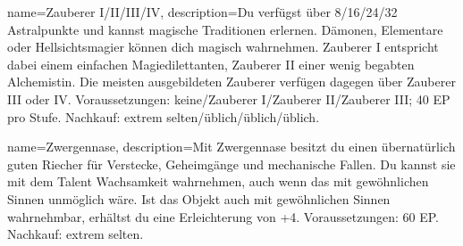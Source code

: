 {
    name={Zauberer I/II/III/IV},
    description={Du verfügst über 8/16/24/32 Astralpunkte und kannst magische Traditionen erlernen. Dämonen, Elementare oder Hellsichtsmagier können dich magisch wahrnehmen. Zauberer I entspricht dabei einem einfachen Magiedilettanten, Zauberer II einer wenig begabten Alchemistin. Die meisten ausgebildeten Zauberer verfügen dagegen über Zauberer III oder IV. Voraussetzungen: keine/Zauberer I/Zauberer II/Zauberer III; 40 EP pro Stufe. Nachkauf: extrem selten/üblich/üblich/üblich.}}

{
    name={Zwergennase},
    description={Mit Zwergennase besitzt du einen übernatürlich guten Riecher für Verstecke, Geheimgänge und mechanische Fallen. Du kannst sie mit dem Talent Wachsamkeit wahrnehmen, auch wenn das mit gewöhnlichen Sinnen unmöglich wäre. Ist das Objekt auch mit gewöhnlichen Sinnen wahrnehmbar, erhältst du eine Erleichterung von +4. Voraussetzungen: 60 EP. Nachkauf: extrem selten.}}
        
    